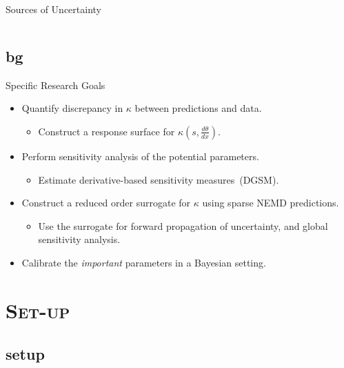 \documentclass[xcolor={x11names,table},compress,svgnames,mathserif]{beamer}
\renewcommand{\(}{\begin{columns}}
\renewcommand{\)}{\end{columns}}
\newcommand{\<}[1]{\begin{column}{#1}}
\renewcommand{\>}{\end{column}}
\newcommand*\myitem{%
  \item[\color{DeepSkyBlue4}\scalebox{0.6}{\ding{110}}]}
\begin{document}
\begin{frame}{Sources of Uncertainty}
\begin{columns}
\begin{column}{0.48\textwidth}
\end{column}
\end{columns}


\end{frame}


\subsection{bg}

\begin{frame}{Specific Research Goals}

\begin{itemize}

\myitem Quantify discrepancy in $\kappa$ between predictions and data.
\begin{itemize}
\item Construct a response surface for $\kappa(s,\frac{d\theta}{dx})$.
\end{itemize}
\vspace{2mm}
\myitem Perform sensitivity analysis of the potential parameters.
\begin{itemize}
\item Estimate derivative-based sensitivity measures~(DGSM).
\end{itemize}
\vspace{2mm}
\myitem Construct a reduced order surrogate for $\kappa$ using sparse
NEMD predictions.
\begin{itemize}
\item Use the surrogate for forward propagation of uncertainty, and global
sensitivity analysis. 
\end{itemize}
\vspace{2mm}
\myitem Calibrate the \textit{important} parameters in a Bayesian setting.

\end{itemize}

\end{frame}


\section{\scshape Set-up}
\subsection{setup}
\end{document}
